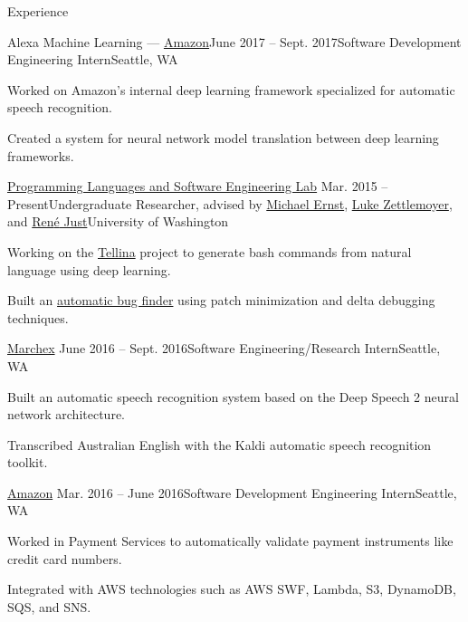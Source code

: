 \documentclass{resume}
\begin{document}
\begin{rSection}{Experience}

  \begin{rSubsection}{Alexa Machine Learning --- {\href{https://www.amazon.com/}{Amazon}}}{June 2017 -- Sept. 2017}{Software Development Engineering Intern}{Seattle, WA}
    \item Worked on Amazon's internal deep learning framework specialized for automatic
    speech recognition.
    \item Created a system for neural network model translation between deep learning frameworks.
  \end{rSubsection}

  \begin{rSubsection}{\href{https://uwplse.org/}{Programming Languages and Software Engineering Lab}}
    {Mar. 2015 -- Present}{Undergraduate Researcher, advised by \href{https://homes.cs.washington.edu/~mernst/}{Michael Ernst}, \href{https://www.cs.washington.edu/people/faculty/lsz}{Luke Zettlemoyer}, and \href{https://people.cs.umass.edu/~rjust/}{Ren{\'e} Just}}{University of Washington}
  \item Working on the \href{https://github.com/TellinaTool}{Tellina} project to generate bash commands from natural language using deep learning.
  \item Built an \href{https://github.com/dericp/patch-minimization}{automatic bug finder} using patch minimization and delta debugging techniques.
  \end{rSubsection}
  
  \begin{rSubsection}{\href{http://www.marchex.com/}{Marchex}}
    {June 2016 -- Sept. 2016}{Software Engineering/Research Intern}{Seattle, WA}
  \item Built an automatic speech recognition system based on the Deep Speech 2 neural network architecture.
  \item Transcribed Australian English with the Kaldi automatic speech recognition toolkit.
  \end{rSubsection}

  \begin{rSubsection}{\href{https://www.amazon.com/}{Amazon}}
    {Mar. 2016 -- June 2016}{Software Development Engineering Intern}{Seattle, WA}
  \item Worked in Payment Services to automatically validate payment instruments like credit card numbers.
  \item Integrated with AWS technologies such as AWS SWF, Lambda, S3, DynamoDB, SQS, and SNS.
  \end{rSubsection}
  

\end{rSection}
\end{document}
